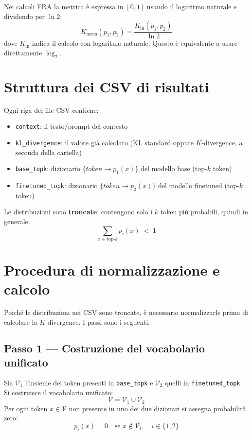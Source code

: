 \documentclass[12pt, a4paper]{article}
\begin{document}
Nei calcoli ERA la metrica è espressa in \([0,1]\) usando il logaritmo naturale e dividendo per \(\ln 2\):
\begin{equation}
    K_{\mathrm{norm}}(p_1, p_2) = \frac{K_{\ln}(p_1, p_2)}{\ln 2}
    \label{eq:knorm}
\end{equation}
dove \(K_{\ln}\) indica il calcolo con logaritmo naturale. Questo è equivalente a usare direttamente \(\log_2\).

\section{Struttura dei CSV di risultati}

Ogni riga dei file CSV contiene:
\begin{itemize}
    \item \texttt{context}: il testo/prompt del contesto
    \item \texttt{kl\_divergence}: il valore già calcolato (KL standard oppure $K$-divergence, a seconda della cartella)
    \item \texttt{base\_topk}: dizionario \(\{token \to p_1(x)\}\) del modello base (top-\(k\) token)
    \item \texttt{finetuned\_topk}: dizionario \(\{token \to p_2(x)\}\) del modello finetuned (top-\(k\) token)
\end{itemize}

\noindent Le distribuzioni sono \textbf{troncate}: contengono solo i \(k\) token più probabili, quindi in generale:
\begin{equation}
    \sum_{x \in \text{top-}k} p_i(x) \;<\; 1
\end{equation}

\section{Procedura di normalizzazione e calcolo}

Poiché le distribuzioni nei CSV sono troncate, è necessario normalizzarle prima di calcolare la \(K\)-divergence. I passi sono i seguenti.

\subsection*{Passo 1 — Costruzione del vocabolario unificato}

Sia \(\mathcal{V}_1\) l'insieme dei token presenti in \texttt{base\_topk} e \(\mathcal{V}_2\) quelli in \texttt{finetuned\_topk}.
Si costruisce il vocabolario unificato:
\begin{equation}
    \mathcal{V} = \mathcal{V}_1 \cup \mathcal{V}_2
\end{equation}
Per ogni token \(x \in \mathcal{V}\) non presente in uno dei due dizionari si assegna probabilità zero:
\begin{equation}
    p_i(x) = 0 \quad \text{se } x \notin \mathcal{V}_i, \quad i \in \{1, 2\}
\end{equation}
\end{document}
